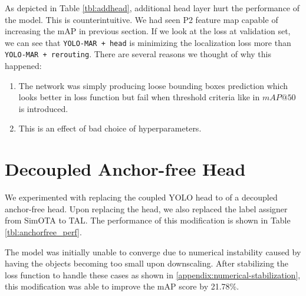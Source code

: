 \begin{table}[H]
  \centering
  \label{tbl:addhead}
  \vspace{-1ex}
  
\end{table}

As depicted in Table \ref{tbl:addhead}, additional head layer hurt the performance of the model.
This is counterintuitive. We had seen P2 feature map capable of increasing the mAP in previous section.
If we look at the loss at validation set, we can see that \verb|YOLO-MAR + head| is 
minimizing the localization loss more than \verb|YOLO-MAR + rerouting|.
There are several reasons we thought of why this happened:
\begin{enumerate}
  \item The network was simply producing loose bounding boxes prediction which looks better in loss function
  but fail when threshold criteria like in $mAP@50$ is introduced.

  \item This is an effect of bad choice of hyperparameters.
\end{enumerate}


\section{Decoupled Anchor-free Head}
We experimented with replacing the coupled YOLO head to of a decoupled anchor-free head.
Upon replacing the head, we also replaced the label assigner from SimOTA to TAL.
The performance of this modification is shown in Table \ref{tbl:anchorfree_perf}.

The model was initially unable to converge due to numerical instability caused by having the objects becoming too small upon downscaling.
After stabilizing the loss function to handle these cases as shown in \ref{appendix:numerical-stabilization}, 
this modification was able to improve the mAP score by 21.78\%.

